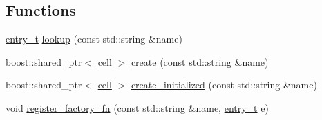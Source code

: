 \subsection*{\-Functions}
\begin{DoxyCompactItemize}
\item 
\hyperlink{structecto_1_1registry_1_1entry__t}{entry\-\_\-t} \hyperlink{namespaceecto_1_1registry_a6418eb4a71ad1556cf3555da28e16a8d}{lookup} (const std\-::string \&name)
\item 
boost\-::shared\-\_\-ptr$<$ \hyperlink{structecto_1_1cell}{cell} $>$ \hyperlink{namespaceecto_1_1registry_a784e20c3d722892c0ce9f129b6c2f757}{create} (const std\-::string \&name)
\item 
boost\-::shared\-\_\-ptr$<$ \hyperlink{structecto_1_1cell}{cell} $>$ \hyperlink{namespaceecto_1_1registry_af698665e1f634f8634ecd7348aa778ab}{create\-\_\-initialized} (const std\-::string \&name)
\item 
void \hyperlink{namespaceecto_1_1registry_aef6687acec4199b3863fac767049bf76}{register\-\_\-factory\-\_\-fn} (const std\-::string \&name, \hyperlink{structecto_1_1registry_1_1entry__t}{entry\-\_\-t} e)
\end{DoxyCompactItemize}


